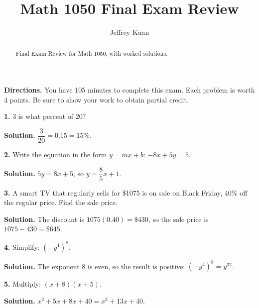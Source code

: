 \documentclass{ximera}
\author{Jeffrey Kuan}
\title{Math 1050 Final Exam Review}
\begin{document}
\begin{abstract}
    Final Exam Review for Math 1050, with worked solutions.
\end{abstract}

\maketitle

\textbf{Directions.} You have 105 minutes to complete this exam. Each problem is worth
4 points. Be sure to show your work to obtain partial credit.

\begin{problem}

\textbf{1.} 3 is what percent of 20?

\begin{hint}
\textbf{Solution.} $\dfrac{3}{20}=0.15=15\%$.
\end{hint}
\end{problem}

\begin{problem}

\textbf{2.} Write the equation in the form $y=mx+b$: $-8x+5y=5$.

\begin{hint}
\textbf{Solution.} $5y=8x+5$, so $y=\dfrac{8}{5}x+1$.
\end{hint}
\end{problem}

\begin{problem}

\textbf{3.} A smart TV that regularly sells for \$1075 is on sale on Black Friday, $40\%$
off the regular price. Find the sale price.

\begin{hint}
\textbf{Solution.} The discount is $1075(0.40)=\$430$, so the sale price is
$1075-430=\$645$.
\end{hint}
\end{problem}

\begin{problem}

\textbf{4.} Simplify: $\left(-y^{4}\right)^{8}$.

\begin{hint}
\textbf{Solution.} The exponent 8 is even, so the result is positive:
$\left(-y^{4}\right)^{8}=y^{32}$.
\end{hint}
\end{problem}

\begin{problem}

\textbf{5.} Multiply: $(x+8)(x+5)$.

\begin{hint}
\textbf{Solution.} $x^{2}+5x+8x+40=x^{2}+13x+40$.
\end{hint}
\end{problem}
\end{document}
